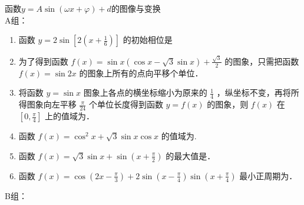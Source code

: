 \zsd 函数$y=A\sin(\omega{x}+\varphi)+d$的图像与变换 \\
A组：
\begin{enumerate}
\item 函数 $y=2 \sin \left[2\left(x+\frac{1}{6}\right)\right]$ 的初始相位是

\item 为了得到函数 $f(x)=\sin x(\cos x-\sqrt{3} \sin x)+\frac{\sqrt{3}}{2}$ 的图象，只需把函数 $f(x)=\sin 2 x$ 的图象上所有的点向平移个单位．

\item 将函数 $y=\sin x$ 图象上各点的横坐标缩小为原来的 $\frac{1}{4}$ ，纵坐标不变，再将所得图象向左平移 $\frac{\pi}{24}$ 个单位长度得到函数 $y=f(x)$ 的图象，则 $f(x)$ 在 $\left[0, \frac{\pi}{4}\right]$ 上的值域为\blkda{[$-\frac{1}{2},1$]}．

\item 函数 $f(x)=\cos ^2 x+\sqrt{3} \sin x \cos x$ 的值域为.

\item 函数 $f(x)=\sqrt{3} \sin x+\sin \left(x+\frac{\pi}{2}\right)$ 的最大值是．

\item 函数 $f(x)=\cos \left(2 x-\frac{\pi}{3}\right)+2 \sin \left(x-\frac{\pi}{4}\right) \sin \left(x+\frac{\pi}{4}\right)$ 最小正周期为\blkda{$\pi$}．
\end{enumerate}


B组：

